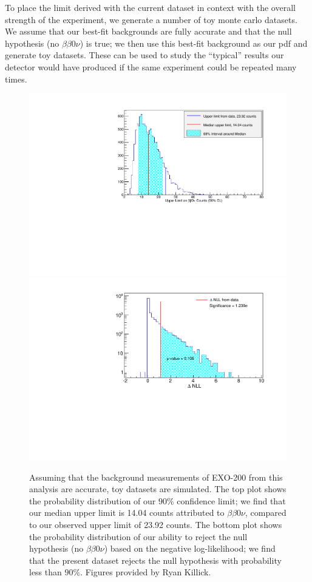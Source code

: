 To place the limit derived with the current dataset in context with the overall strength of the experiment, we generate a number of toy monte carlo datasets.  We assume that our best-fit backgrounds are fully accurate and that the null hypothesis (no $\beta\beta 0\nu$) is true; we then use this best-fit background as our pdf and generate toy datasets.  These can be used to study the ``typical'' results our detector would have produced if the same experiment could be repeated many times.

\begin{figure}
\begin{center}
\includegraphics[keepaspectratio=true,width=.9\textwidth]{toy_mc_sensitivity.pdf}
\includegraphics[keepaspectratio=true,width=.9\textwidth]{toy_mc_significance.pdf}
\end{center}
\renewcommand{\baselinestretch}{1}
\small\normalsize
\begin{quote}
\caption{Assuming that the background measurements of EXO-200 from this analysis are accurate, toy datasets are simulated.  The top plot shows the probability distribution of our $90\%$ confidence limit; we find that our median upper limit is 14.04 counts attributed to $\beta\beta 0\nu$, compared to our observed upper limit of 23.92 counts.  The bottom plot shows the probability distribution of our ability to reject the null hypothesis (no $\beta\beta 0\nu$) based on the negative log-likelihood; we find that the present dataset rejects the null hypothesis with probability less than $90\%$.  Figures provided by Ryan Killick.}
\label{fig:ToyMCSensitivitySelectivity}
\end{quote}
\end{figure}
